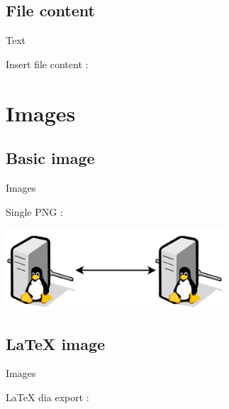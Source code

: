 \documentclass[aspectratio=43]{beamer}
\begin{document}
 
\subsection{File content}
\begin{frame}{Text}
 
Insert file content :
 
\end{frame}


\section{Images}


\subsection{Basic image}
\begin{frame}{Images}

Single PNG : 
\begin{center}
\includegraphics[height=30mm]{images/dia_example.png}
\end{center}
 
\end{frame}
 
 
\subsection{LaTeX image}
\begin{frame}{Images}
 
LaTeX dia export :

\begin{center}

\end{center}

\end{frame} 
\end{document}
